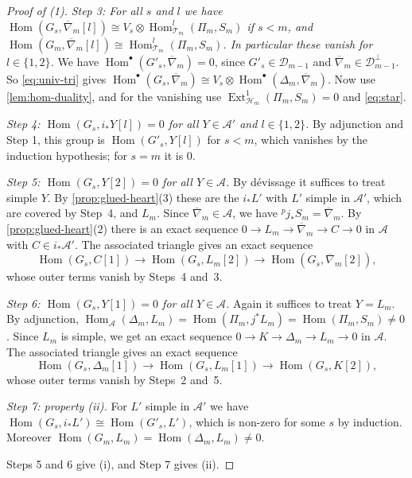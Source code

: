 \documentclass[11pt,reqno]{amsart}
\theoremstyle{plain}
\theoremstyle{definition}
\theoremstyle{remark}
\DeclareMathOperator{\Hom}{Hom}
\DeclareMathOperator{\Ext}{Ext}
\newcommand{\nablabar}{\overline{\nabla}}
\newcommand{\cD}{\mathcal{D}}
\newcommand{\cA}{\mathcal{A}}
\newcommand{\cH}{\mathcal{H}}
\newcommand{\cT}{\mathcal{T}}
\begin{document}
\begin{proof}[Proof of \textup{(1)}]
\emph{Step 3: For all $s$ and $l$ we have $\Hom(G_s,\nablabar_m[l])\cong V_s\otimes\Hom^l_{\cT_m}(\Pi_m,S_m)$ if $s<m$, and $\Hom(G_m,\nablabar_m[l])\cong\Hom^l_{\cT_m}(\Pi_m,S_m)$. In particular these vanish for $l\in\{1,2\}$.} We have $\Hom^\bullet(G'_s,\nablabar_m)=0$, since $G'_s\in\cD_{m-1}$ and $\nablabar_m\in\cD_{m-1}^\perp$. So \eqref{eq:univ-tri} gives $\Hom^\bullet(G_s,\nablabar_m)\cong V_s\otimes\Hom^\bullet(\Delta_m,\nablabar_m)$. Now use \cref{lem:hom-duality}, and for the vanishing use $\Ext^1_{\cH_m}(\Pi_m,S_m)=0$ and \eqref{eq:star}.

\emph{Step 4: $\Hom(G_s,i_*Y[l])=0$ for all $Y\in\cA'$ and $l\in\{1,2\}$.} By adjunction and Step 1, this group is $\Hom(G'_s,Y[l])$ for $s<m$, which vanishes by the induction hypothesis; for $s=m$ it is $0$.

\emph{Step 5: $\Hom(G_s,Y[2])=0$ for all $Y\in\cA$.} By d\'evissage it suffices to treat simple $Y$. By \cref{prop:glued-heart}(3) these are the $i_*L'$ with $L'$ simple in $\cA'$, which are covered by Step~4, and $L_m$. Since $\nablabar_m\in\cA$, we have ${}^p\!j_*S_m=\nablabar_m$. By \cref{prop:glued-heart}(2) there is an exact sequence $0\to L_m\to\nablabar_m\to C\to0$ in $\cA$ with $C\in i_*\cA'$. The associated triangle gives an exact sequence
\[\Hom(G_s,C[1])\to\Hom(G_s,L_m[2])\to\Hom(G_s,\nablabar_m[2]),\]
whose outer terms vanish by Steps~4 and~3.

\emph{Step 6: $\Hom(G_s,Y[1])=0$ for all $Y\in\cA$.} Again it suffices to treat $Y=L_m$. By adjunction, $\Hom_\cA(\Delta_m,L_m)=\Hom(\Pi_m,j^*L_m)=\Hom(\Pi_m,S_m)\ne0$. Since $L_m$ is simple, we get an exact sequence $0\to K\to\Delta_m\to L_m\to0$ in $\cA$. The associated triangle gives an exact sequence
\[\Hom(G_s,\Delta_m[1])\to\Hom(G_s,L_m[1])\to\Hom(G_s,K[2]),\]
whose outer terms vanish by Steps~2 and~5.

\emph{Step 7: property \textup{(ii)}.} For $L'$ simple in $\cA'$ we have $\Hom(G_s,i_*L')\cong\Hom(G'_s,L')$, which is non-zero for some $s$ by induction. Moreover $\Hom(G_m,L_m)=\Hom(\Delta_m,L_m)\ne0$.

Steps 5 and 6 give (i), and Step 7 gives (ii).
\end{proof}
\end{document}

